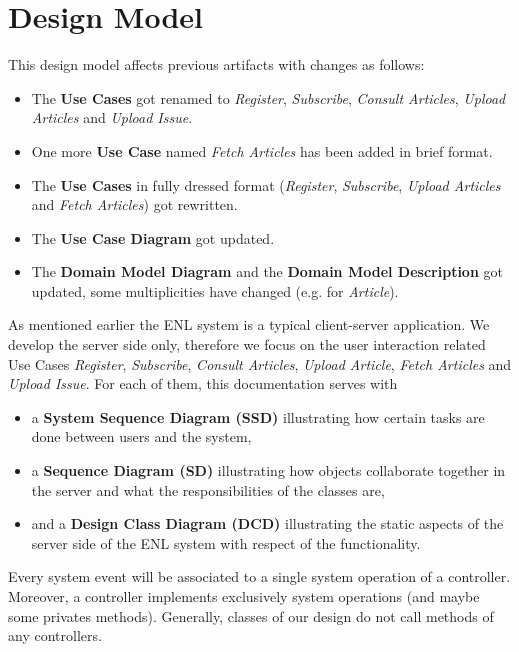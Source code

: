 \section{Design Model}
\label{sec:design-model}
This design model affects previous artifacts with changes as follows:
\begin{itemize}
  \item The \textbf{Use Cases} got renamed to \textit{Register}, \textit{Subscribe}, \textit{Consult Articles}, \textit{Upload Articles} and \textit{Upload Issue}. 
  \item One more \textbf{Use Case} named \textit{Fetch Articles} has been added in brief format.
  \item The \textbf{Use Cases} in fully dressed format (\textit{Register}, \textit{Subscribe}, \textit{Upload Articles} and \textit{Fetch Articles}) got rewritten.
  \item The \textbf{Use Case Diagram} got updated.
  \item The \textbf{Domain Model Diagram} and the \textbf{Domain Model Description} got updated, some multiplicities have changed (e.g. for \textit{Article}).
\end{itemize}

As mentioned earlier the ENL system is a typical client-server application. We develop the server side only, therefore we focus on the user interaction related Use Cases \textit{Register}, \textit{Subscribe}, \textit{Consult Articles}, \textit{Upload Article}, \textit{Fetch Articles} and \textit{Upload Issue}. For each of them, this documentation serves with
\begin{itemize}
  \item a \textbf{System Sequence Diagram (SSD)} illustrating how certain tasks are done between users and the system, 
  \item a \textbf{Sequence Diagram (SD)} illustrating how objects collaborate together in the server and what the responsibilities of the classes are, 
  \item and a \textbf{Design Class Diagram (DCD)} illustrating the static aspects of the server side of the ENL system with respect of the functionality.
\end{itemize}

Every system event will be associated to a single system operation of a controller. Moreover, a controller implements exclusively system operations (and maybe some privates methods). Generally, classes of our design do not call methods of any controllers.
\newpage

